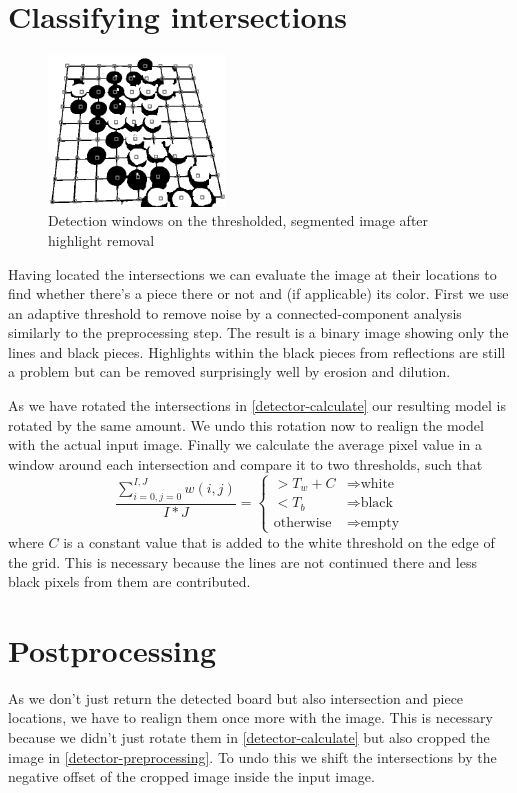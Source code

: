 	\vfill
	\pagebreak

	\section{Classifying intersections}
	\label{detector-classifying}
	\begingroup
	\setlength{\columnsep}{20pt}%
	\begin{figure}
		\centering
  		\vspace{-30pt}
	    \includegraphics[width=0.42\textwidth]{images/colorDetection.png}
	  	\caption{Detection windows on the thresholded, segmented image after highlight removal}
	\end{figure}
	Having located the intersections we can evaluate the image at their locations to find whether there's a piece there or not and (if applicable) its color. First we use an adaptive threshold to remove noise by a connected-component analysis similarly to the preprocessing step. The result is a binary image showing only the lines and black pieces. Highlights within the black pieces from reflections are still a problem but can be removed surprisingly well by erosion and dilution.

	\endgroup

	As we have rotated the intersections in \autoref{detector-calculate} our resulting model is rotated by the same amount. We undo this rotation now to realign the model with the actual input image. Finally we calculate the average pixel value in a window around each intersection and compare it to two thresholds, such that \begin{equation}
		\frac{\sum^{I,J}_{i=0,j=0}w(i,j)}{I*J} =
		\begin{cases}
		> T_{w} + C & \Rightarrow  \text{white}\\
		< T_{b} & \Rightarrow \text{black}\\
		\text{otherwise} & \Rightarrow \text{empty}
		\end{cases}
	\end{equation}
	where $C$ is a constant value that is added to the white threshold on the edge of the grid. This is necessary because the lines are not continued there and less black pixels from them are contributed.


	\section{Postprocessing}
	As we don't just return the detected board but also intersection and piece locations, we have to realign them once more with the image. This is necessary because we didn't just rotate them in \autoref{detector-calculate} but also cropped the image in \autoref{detector-preprocessing}. To undo this we shift the intersections by the negative offset of the cropped image inside the input image.
